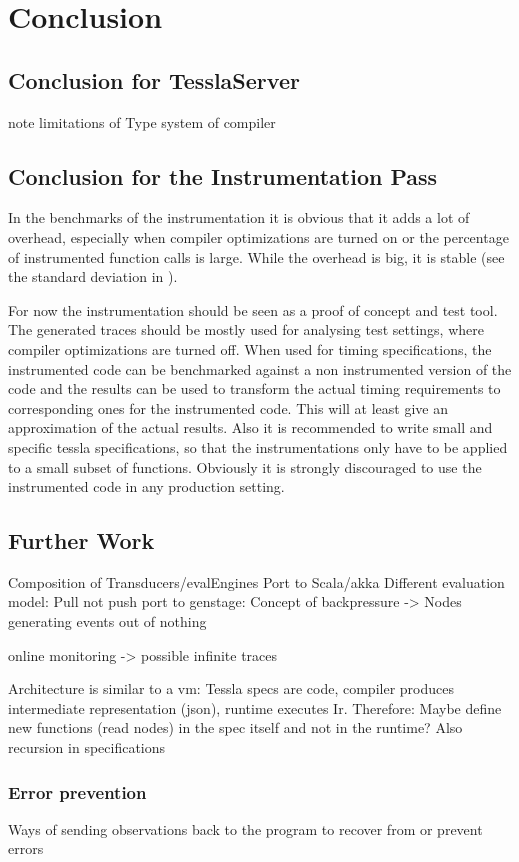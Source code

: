 %
\chapter{Conclusion}
\label{sec:conclusion}

\section{Conclusion for TesslaServer}

note limitations of Type system of compiler

\section{Conclusion for the Instrumentation Pass}

In the benchmarks of the instrumentation it is obvious that it adds a lot of overhead, especially when compiler optimizations are turned on or the percentage of instrumented function calls is large.
While the overhead is big, it is stable (see the standard deviation in ).

For now the instrumentation should be seen as a proof of concept and test tool.
The generated traces should be mostly used for analysing test settings, where compiler optimizations are turned off.
When used for timing specifications, the instrumented code can be benchmarked against a non instrumented version of the code and the results can be used to transform the actual timing requirements to corresponding ones for the instrumented code.
This will at least give an approximation of the actual results.
Also it is recommended to write small and specific \gls{tessla} specifications, so that the instrumentations only have to be applied to a small subset of functions.
Obviously it is strongly discouraged to use the instrumented code in any production setting.

\section{Further Work}
\label{sec:conclusion:further_work}

Composition of Transducers/evalEngines
Port to Scala/akka
Different evaluation model: Pull not push
  port to genstage: Concept of backpressure -> Nodes generating events out of nothing


online monitoring -> possible infinite traces

Architecture is similar to a vm: Tessla specs are code, compiler produces intermediate representation (json), runtime executes Ir.
Therefore: Maybe define new functions (read nodes) in the spec itself and not in the runtime? Also recursion in specifications

\subsection{Error prevention}
\label{sec:conclusion:further_work:error_prevention}
Ways of sending observations back to the program to recover from or prevent errors

